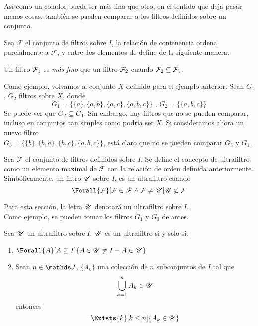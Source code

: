 Así como un colador puede ser más fino que otro, en el sentido que
deja pasar menos cosas, también se pueden comparar a los filtros definidos
sobre un conjunto.

\begin{definition}
  Sea $\mathscr{F}$ el conjunto de filtros sobre $I$, la relación de contenencia
  ordena parcialmente a $\mathscr{F}$, y entre dos elementos de define de la siguiente
  manera:

  Un filtro $\mathcal{F}_1$ es \emph{más fino} que un filtro $\mathcal{F}_2$ cuando $\mathcal{F}_2 \subseteq \mathcal{F}_1$.
\end{definition}

Como ejemplo, volvamos al conjunto $X$ definido para el ejemplo anterior. Sean $G_1$, $G_2$
filtros sobre $X$, donde
\[G_1 = \{\{a\}, \{a,b\},\{a,c\},\{a,b,c\}\}\text{ , } G_2 = \{\{a,b,c\}\}\]
Se puede ver que $G_2 \subseteq G_1$. Sin embargo, hay filtros que no
se pueden comparar, incluso en conjuntos tan simples como podría ser
$X$. Si consideramos ahora un nuevo filtro\\
$G_3 = \{\{b\}, \{b,a\},\{b,c\},\{a,b,c\}\}$, está claro que no se pueden comparar
$G_3$ y $G_1$.

\begin{definition}
  Sea $\mathscr{F}$ el conjunto de filtros definidos sobre $I$. Se define
  el concepto de ultrafiltro como un elemento maximal de $\mathscr{F}$ con
  la relación de orden definida anteriormente. Simbólicamente,
  un filtro $\mathscr{U}$ sobre $I$, es un ultrafiltro cuando
  \[\Forall{\F}[\F\in\mathscr{F}\land\F \not=\U]{\U\not\subset\F}\]

  Para esta sección, la letra $\mathscr{U}$ denotará un ultrafiltro sobre $I$.\\
  Como ejemplo, se pueden tomar los filtros $G_1$ y $G_3$ de antes.
\end{definition}
\pagebreak
\begin{theorem}[Caracterizaciones]
  Sea $\mathscr{U}$ un ultrafiltro sobre $I$. $\mathscr{U}$ es un ultrafiltro si y solo si:
  \begin{enumerate}
    \item $\Forall{A}[A\subseteq I]{A\in\U \not\equiv I-A \in \U}$
    \item Sean $n\in\J$, $\{A_k\}$ una colección de $n$ subconjuntos de $I$ tal que
          \[\bigcup_{k=1}^n A_k \in \mathscr{U}\]
          entonces
          \[\Exists{k}[k\leq n]{A_k\in\U}\]
  \end{enumerate}
\end{theorem}

